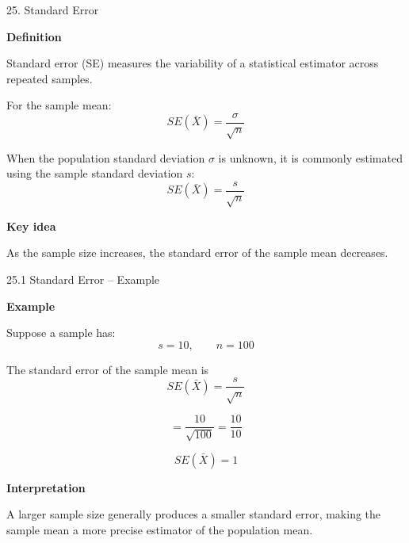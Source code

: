 
\begin{frame}{25. Standard Error}

\textbf{Definition}

Standard error (SE) measures the variability of a statistical
estimator across repeated samples.

For the sample mean:
\[
\boxed{
SE(\bar{X})
=
\frac{\sigma}{\sqrt{n}}
}
\]

When the population standard deviation $\sigma$ is unknown,
it is commonly estimated using the sample standard deviation $s$:
\[
\boxed{
SE(\bar{X})
=
\frac{s}{\sqrt{n}}
}
\]

\vspace{0.1cm}

\textbf{Key idea}

As the sample size increases, the standard error of the sample
mean decreases.

\end{frame}



\begin{frame}{25.1 Standard Error -- Example}

\textbf{Example}

Suppose a sample has:
\[
s=10,
\qquad
n=100
\]

The standard error of the sample mean is
\[
SE(\bar{X})
=
\frac{s}{\sqrt{n}}
\]

\[
=
\frac{10}{\sqrt{100}}
=
\frac{10}{10}
\]

\[
\boxed{
SE(\bar{X})=1
}
\]

\textbf{Interpretation}

A larger sample size generally produces a smaller standard error,
making the sample mean a more precise estimator of the population mean.

\end{frame}



